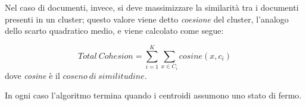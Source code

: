 Nel caso di documenti, invece, si deve massimizzare la similarità tra i documenti presenti in un cluster; questo valore viene detto \emph{coesione} del cluster, l'analogo dello scarto quadratico medio, e viene calcolato come segue:

\begin{equation*}
	Total\ Cohesion = \sum_{i=1}^{K}{\sum_{x \in C_i} {cosine(x, c_i)}}
\end{equation*}
dove \emph{cosine} è il $coseno\ di\ similitudine$.

In ogni caso l'algoritmo termina quando i centroidi assumono uno stato di fermo\cite{k-means}. 
